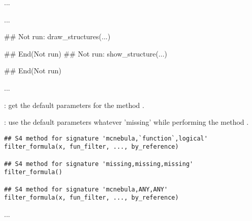 \documentclass[letterpaper]{book}
\begin{document}
%
\begin{Details}\relax
...
\end{Details}
%
\begin{Value}
...
\end{Value}
%
\begin{SeeAlso}\relax
{}
\end{SeeAlso}
%
\begin{Examples}
\begin{ExampleCode}
## Not run: 
draw_structures(...)

## End(Not run)
## Not run: 
show_structure(...)

## End(Not run)
\end{ExampleCode}
\end{Examples}
%
\begin{Description}\relax
...

: get the default parameters for the method
.

: use the default parameters whatever 'missing'
while performing the method .
\end{Description}
%
\begin{Usage}
\begin{verbatim}
## S4 method for signature 'mcnebula,`function`,logical'
filter_formula(x, fun_filter, ..., by_reference)

## S4 method for signature 'missing,missing,missing'
filter_formula()

## S4 method for signature 'mcnebula,ANY,ANY'
filter_formula(x, fun_filter, ..., by_reference)
\end{verbatim}
\end{Usage}
%
\begin{Arguments}
\begin{ldescription}
\item[\code{param}] ...
\end{ldescription}
\end{Arguments}
\end{document}

